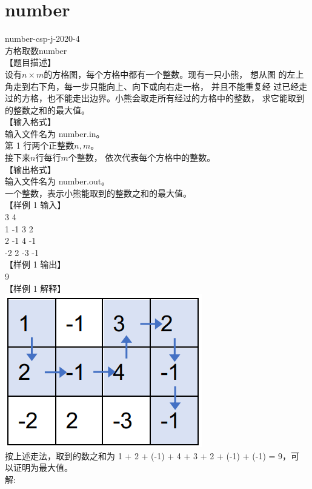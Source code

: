 \documentclass[12pt,twiside,a4paper]{ctexbook}
\numberwithin{chapter}{part}
\begin{document}
\section{number}
number-csp-j-2020-4\\
方格取数number\\
【题目描述】\\
设有$n\times m$的方格图，每个方格中都有一个整数。现有一只小熊， 想从图
的左上角走到右下角，每一步只能向上、向下或向右走一格， 并且不能重复经
过已经走过的方格，也不能走出边界。小熊会取走所有经过的方格中的整数，
求它能取到的整数之和的最大值。\\
【输入格式】\\
输入文件名为 number.in。\\
第 1 行两个正整数$n,m$。\\
接下来$n$行每行$m$个整数， 依次代表每个方格中的整数。\\
【输出格式】\\
输入文件名为 number.out。\\
一个整数，表示小熊能取到的整数之和的最大值。\\
【样例 1 输入】\\
3 4\\
1 -1 3 2\\
2 -1 4 -1\\
-2 2 -3 -1\\
【样例 1 输出】\\
9\\
【样例 1 解释】\\
\includegraphics[scale=0.5]{num.png}\\
按上述走法，取到的数之和为 1 + 2 + (-1) + 4 + 3 + 2 + (-1) + (-1) = 9，可
以证明为最大值。\\
解:
\end{document}
